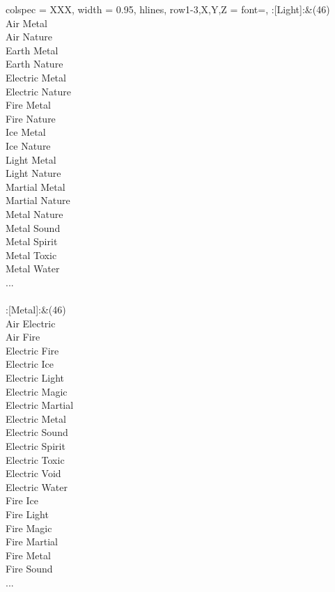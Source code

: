 \begin{longtblr}[
	caption = {1v2 Attacking Ineffective},
	label = {1v2-Attacking-Ineffective},
]{
	colspec = {XXX}, width = 0.95\linewidth,
	hlines,
	row{1-3,X,Y,Z} = {font=\bfseries},
}
	:[Light]:&{(46)\\
	Air Metal \\
	Air Nature \\
	Earth Metal \\
	Earth Nature \\
	Electric Metal \\
	Electric Nature \\
	Fire Metal \\
	Fire Nature \\
	Ice Metal \\
	Ice Nature \\
	Light Metal \\
	Light Nature \\
	Martial Metal \\
	Martial Nature \\
	Metal Nature \\
	Metal Sound \\
	Metal Spirit \\
	Metal Toxic \\
	Metal Water \\
	...\\
	}\\

	:[Metal]:&{(46)\\
	Air Electric \\
	Air Fire \\
	Electric Fire \\
	Electric Ice \\
	Electric Light \\
	Electric Magic \\
	Electric Martial \\
	Electric Metal \\
	Electric Sound \\
	Electric Spirit \\
	Electric Toxic \\
	Electric Void \\
	Electric Water \\
	Fire Ice \\
	Fire Light \\
	Fire Magic \\
	Fire Martial \\
	Fire Metal \\
	Fire Sound \\
	...\\
	}\\


\end{longtblr}
